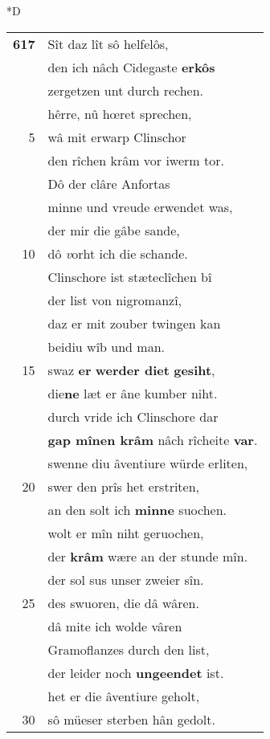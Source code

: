 \documentclass[8pt,a4paper,notitlepage]{article}
\begin{document}
\begin{table}[ht]
\begin{minipage}[t]{0.5\linewidth}
\small
\begin{center}*D
\end{center}
\begin{tabular}{rl}
\textbf{617} & Sît daz lît sô helfelôs,\\ 
 & den ich nâch Cidegaste \textbf{erkôs}\\ 
 & zergetzen unt durch rechen.\\ 
 & hêrre, nû hœret sprechen,\\ 
5 & wâ mit erwarp Clinschor\\ 
 & den rîchen krâm vor iwerm tor.\\ 
 & Dô der clâre Anfortas\\ 
 & minne und vreude erwendet was,\\ 
 & der mir die gâbe sande,\\ 
10 & dô \textit{v}orht ich die schande.\\ 
 & Clinschore ist stæteclîchen bî\\ 
 & der list von nigromanzî,\\ 
 & daz er mit zouber twingen kan\\ 
 & beidiu wîb und man.\\ 
15 & swaz \textbf{er} \textbf{werder diet} \textbf{gesiht},\\ 
 & die\textbf{ne} læt er âne kumber niht.\\ 
 & durch vride ich Clinschore dar\\ 
 & \textbf{gap mînen krâm} nâch rîcheite \textbf{var}.\\ 
 & swenne diu âventiure würde erliten,\\ 
20 & swer den prîs het erstriten,\\ 
 & an den solt ich \textbf{minne} suochen.\\ 
 & wolt er mîn niht geruochen,\\ 
 & der \textbf{krâm} wære an der stunde mîn.\\ 
 & der sol sus unser zweier sîn.\\ 
25 & des swuoren, die dâ wâren.\\ 
 & dâ mite ich wolde vâren\\ 
 & Gramoflanzes durch den list,\\ 
 & der leider noch \textbf{ungeendet} ist.\\ 
 & het er die âventiure geholt,\\ 
30 & sô müeser sterben hân gedolt.\\ 

\end{tabular}
\end{minipage}
\end{table}
\end{document}
